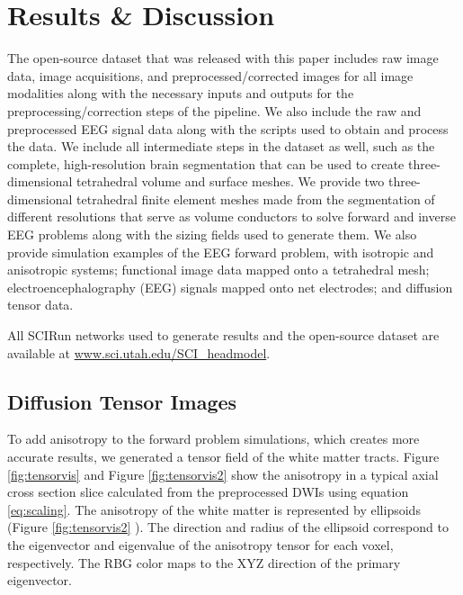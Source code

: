 %

\section{Results \& Discussion}
\label{sec:results}

The open-source dataset that was released with this paper includes raw image data, image acquisitions, and preprocessed/corrected images for all image modalities along with the necessary inputs and outputs for the preprocessing/correction steps of the pipeline. We also include the raw and preprocessed EEG signal data along with the scripts used to obtain and process the data. We include all intermediate steps in the dataset as well, such as the complete, high-resolution brain segmentation that can be used to create three-dimensional tetrahedral volume and surface meshes. We provide two three-dimensional tetrahedral finite element meshes made from the segmentation of different resolutions that serve as volume conductors to solve forward and inverse EEG problems along with the sizing fields used to generate them. We also provide simulation examples of the EEG forward problem, with isotropic and anisotropic systems; functional image data mapped onto a tetrahedral mesh; electroencephalography (EEG) signals mapped onto net electrodes; and diffusion tensor data. 

All SCIRun networks used to generate results and the open-source dataset are available at \url{www.sci.utah.edu/SCI_headmodel}. 

\subsection{Diffusion Tensor Images}

To add anisotropy to the forward problem simulations, which creates more accurate results, we generated a tensor field of the white matter tracts. Figure \ref{fig:tensorvis} and Figure \ref{fig:tensorvis2} show the anisotropy in a typical axial cross section slice calculated from the preprocessed DWIs using equation \ref{eq:scaling}. The anisotropy of the white matter is represented by ellipsoids (Figure \ref{fig:tensorvis2} ). The direction and radius of the ellipsoid correspond to the eigenvector and eigenvalue of the anisotropy tensor for each voxel, respectively. The RBG color maps to the XYZ direction of the primary eigenvector.               

